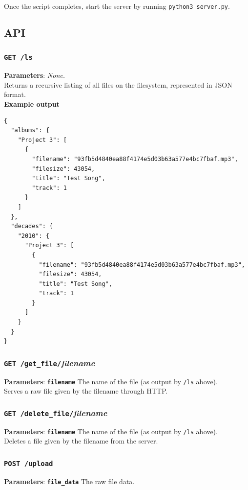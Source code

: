 \documentclass{article}
\begin{document}
	\noindent Once the script completes, start the server by running \texttt{python3 server.py}.
	
	\pagebreak
	
	\subsection{API}
	\subsubsection{\texttt{GET /ls}}
	\textbf{Parameters}: \textit{None.} \\
	
	\noindent Returns a recursive listing of all files on the filesystem, represented in JSON format. \\

	\noindent\textbf{Example output}
\begin{lstlisting}
{
  "albums": {
    "Project 3": [
      {
        "filename": "93fb5d4840ea88f4174e5d03b63a577e4bc7fbaf.mp3",
        "filesize": 43054,
        "title": "Test Song",
        "track": 1
      }
    ]
  },
  "decades": {
    "2010": {
      "Project 3": [
        {
          "filename": "93fb5d4840ea88f4174e5d03b63a577e4bc7fbaf.mp3",
          "filesize": 43054,
          "title": "Test Song",
          "track": 1
        }
      ]
    }
  }
}
\end{lstlisting}
	
	\subsubsection{\texttt{GET /get\_file/}\textit{filename}}
	\textbf{Parameters}: \textbf{\texttt{filename}} The name of the file (as output by \texttt{/ls} above). \\
	
	\noindent Serves a raw file given by the filename through HTTP.
	
	\subsubsection{\texttt{GET /delete\_file/}\textit{filename}}
	\textbf{Parameters}: \textbf{\texttt{filename}} The name of the file (as output by \texttt{/ls} above). \\
	
	\noindent Deletes a file given by the filename from the server.
	
	\subsubsection{\texttt{POST /upload}}
	\textbf{Parameters}: \textbf{\texttt{file\_data}} The raw file data. \\
	
\end{document}
